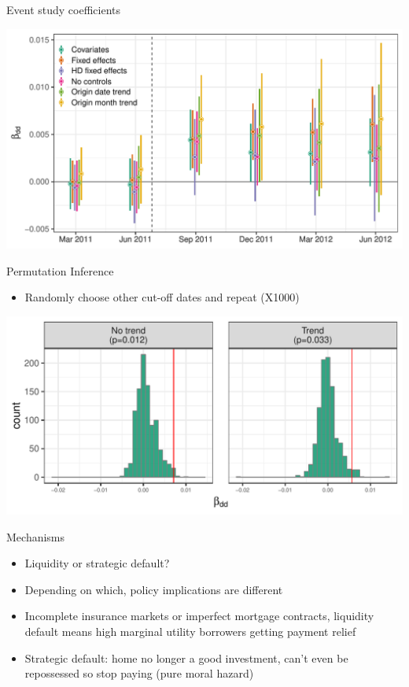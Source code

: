 \documentclass[ignorenonframetext,aspectratio=169]{beamer}
\providecommand{\tightlist}{%
  \setlength{\itemsep}{0pt}\setlength{\parskip}{0pt}}
\begin{document}
\begin{frame}{Event study coefficients}

\centering\includegraphics[width=\linewidth]{es_graph.pdf}

\end{frame}

\begin{frame}{Permutation Inference}

\begin{itemize}
\tightlist
\item
  Randomly choose other cut-off dates and repeat (X1000)
\end{itemize}

\centering\includegraphics[width=\linewidth]{ri_plot.pdf}

\end{frame}

\begin{frame}{Mechanisms}

\begin{itemize}
\item
  Liquidity or strategic default?
\item
  Depending on which, policy implications are different
\item
  Incomplete insurance markets or imperfect mortgage contracts,
  liquidity default means high marginal utility borrowers getting
  payment relief
\item
  Strategic default: home no longer a good investment, can't even be
  repossessed so stop paying (pure moral hazard)
\end{itemize}

\end{frame}
\end{document}
